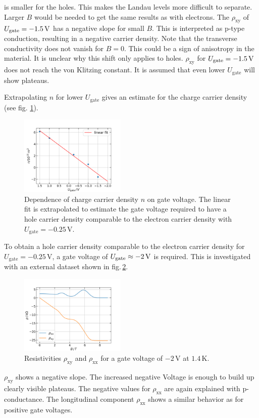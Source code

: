 is smaller for the holes.
This makes the Landau levels more difficult to separate. 
Larger $B$ would be needed to get the same results as with electrons.
The $\rho_\text{xy}$ of $U_\text{gate} = -1.5\,\text V$ has a negative slope for small $B$.
This is interpreted as p-type conduction, resulting in a negative carrier density.
Note that the transverse conductivity does not vanish for $B=0$.
This could be a sign of anisotropy in the material.
It is unclear why this shift only applies to holes.
$\rho_\text{xy}$ for $U_\text{gate} = -1.5 \,\text V$ does not reach the von Klitzing constant.
It is assumed that even lower $U_\text{gate}$ will show plateaus.

Extrapolating $n$ for lower $U_\text{gate}$ gives an estimate for the charge carrier density (see fig. \ref{fig:extrapolating}).
\begin{figure}[h]
    \centering
    \includegraphics[width=0.45\textwidth]{../Images/extrapolatingN.png}
    \caption{
        Dependence of charge carrier density $n$ on gate voltage.
        The linear fit is extrapolated to estimate the gate voltage required to have a hole carrier density comparable to the electron carrier density with $U_\text{gate} = -0.25\,\text{V}$.}
    \label{fig:extrapolating}
\end{figure}
To obtain a hole carrier density comparable to the electron carrier density for $U_\text{gate} = -0.25\,\text{V}$,
a gate voltage of $U_\text{gate} \approx -2\,\text V$ is required.
This is investigated with an external dataset shown in fig.\,\ref{fig.externalDataset}.
\begin{figure}[h]
    \centering
    \includegraphics[width=0.45\textwidth]{../Images/neuerDatensatz.png}
    \caption{Resistivities $\rho_\text{xy}$ and $\rho_\text{xx}$ for a gate voltage of $-2\,\text{V}$ at $1.4\,\text{K}$.
    }
    \label{fig.externalDataset}
\end{figure}
$\rho_\text{xy}$ shows a negative slope. 
The increased negative Voltage is enough to build up clearly visible plateaus. 
The negative values for $\rho_\text{xx}$ are again explained with p-conductance.
The longitudinal component $\rho_\text{xx}$ shows a similar behavior as for positive gate voltages.